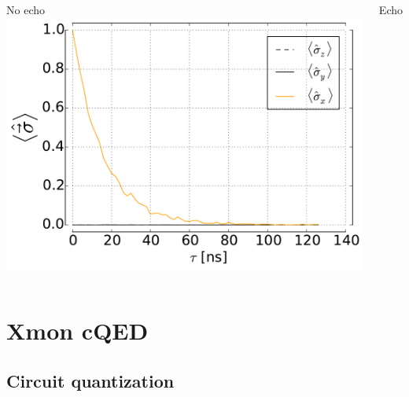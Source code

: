 \documentclass[aspectratio=169, 13pt, t]{beamer}
\begin{document}
\begin{frame}[t]
{\begin{columns}[c]
	No echo
	\centering
	\includegraphics[width=\textwidth]{deph_white_se}
	
	Echo
	\end{columns}
}
\end{frame}

\section{Xmon cQED}


\subsection{Circuit quantization}
\end{document}
